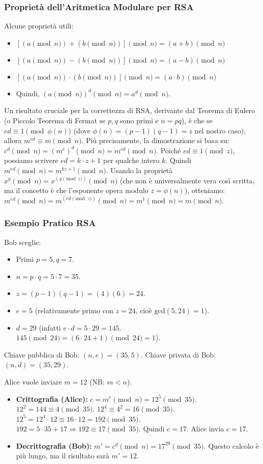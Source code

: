 \subsubsection{Proprietà dell'Aritmetica Modulare per RSA}
\label{ssubsec:prop_mod_rsa}
Alcune proprietà utili:
\begin{itemize}
    \item $[(a \pmod n) + (b \pmod n)] \pmod n = (a+b) \pmod n$
    \item $[(a \pmod n) - (b \pmod n)] \pmod n = (a-b) \pmod n$
    \item $[(a \pmod n) \cdot (b \pmod n)] \pmod n = (a \cdot b) \pmod n$
    \item Quindi, $(a \pmod n)^d \pmod n = a^d \pmod n$.
\end{itemize}
Un risultato cruciale per la correttezza di RSA, derivante dal Teorema di Eulero (o Piccolo Teorema di Fermat se $p,q$ sono primi e $n=pq$), è che se $ed \equiv 1 \pmod{\phi(n)}$ (dove $\phi(n)=(p-1)(q-1)=z$ nel nostro caso), allora $m^{ed} \equiv m \pmod n$.
Più precisamente, la dimostrazione si basa su:
$c^d \pmod n = (m^e)^d \pmod n = m^{ed} \pmod n$.
Poiché $ed \equiv 1 \pmod z$, possiamo scrivere $ed = k \cdot z + 1$ per qualche intero $k$.
Quindi $m^{ed} \pmod n = m^{kz+1} \pmod n$.
Usando la proprietà $x^y \pmod n = x^{(y \pmod z)} \pmod n$ (che non è universalmente vera così scritta, ma il concetto è che l'esponente opera modulo $z=\phi(n)$), otteniamo:
$m^{ed} \pmod n = m^{(ed \pmod z)} \pmod n = m^1 \pmod n = m \pmod n$.

\subsubsection{Esempio Pratico RSA}
\label{ssubsec:esempio_rsa}
Bob sceglie:
\begin{itemize}
    \item Primi $p=5, q=7$.
    \item $n = p \cdot q = 5 \cdot 7 = 35$.
    \item $z = (p-1)(q-1) = (4)(6) = 24$.
    \item $e=5$ (relativamente primo con $z=24$, cioè $\text{gcd}(5,24)=1$).
    \item $d=29$ (infatti $e \cdot d = 5 \cdot 29 = 145$. $145 \pmod{24} = (6 \cdot 24 + 1) \pmod{24} = 1$).
\end{itemize}
Chiave pubblica di Bob: $(n,e) = (35,5)$.
Chiave privata di Bob: $(n,d) = (35,29)$.

Alice vuole inviare $m=12$ (NB: $m<n$).
\begin{itemize}
    \item \textbf{Crittografia (Alice):} $c = m^e \pmod n = 12^5 \pmod{35}$.
    $12^2 = 144 \equiv 4 \pmod{35}$.
    $12^4 \equiv 4^2 = 16 \pmod{35}$.
    $12^5 = 12^4 \cdot 12 \equiv 16 \cdot 12 = 192 \pmod{35}$.
    $192 = 5 \cdot 35 + 17 \Rightarrow 192 \equiv 17 \pmod{35}$. Quindi $c=17$.
    Alice invia $c=17$.
    \item \textbf{Decrittografia (Bob):} $m' = c^d \pmod n = 17^{29} \pmod{35}$.
    Questo calcolo è più lungo, ma il risultato sarà $m'=12$.
\end{itemize}

